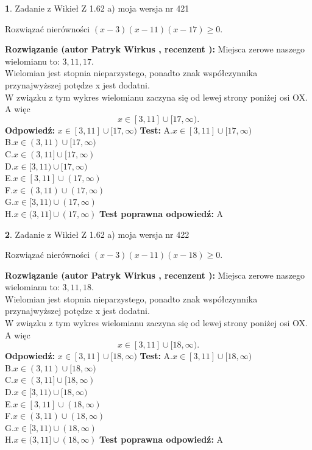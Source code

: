 \documentclass[12pt, a4paper]{article}
\theoremstyle{definition} %
\newtheorem{zad}{}
\newcommand{\zadStart}[1]{\begin{zad}#1\newline}
\newcommand{\zadStop}{\end{zad}}
\newcommand{\rozwStart}[2]{\noindent \textbf{Rozwiązanie (autor #1 , recenzent #2): }\newline}
\newcommand{\rozwStop}{\newline}
\newcommand{\odpStart}{\noindent \textbf{Odpowiedź:}\newline}
\newcommand{\odpStop}{\newline}
\newcommand{\testStart}{\noindent \textbf{Test:}\newline}
\newcommand{\testStop}{\newline}
\newcommand{\kluczStart}{\noindent \textbf{Test poprawna odpowiedź:}\newline}
\newcommand{\kluczStop}{\newline}
\begin{document}
\zadStart{Zadanie z Wikieł Z 1.62 a) moja wersja nr 421}

Rozwiązać nierówności $(x-3)(x-11)(x-17)\ge0$.
\zadStop
\rozwStart{Patryk Wirkus}{}
Miejsca zerowe naszego wielomianu to: $3, 11, 17$.\\
Wielomian jest stopnia nieparzystego, ponadto znak współczynnika przy\linebreak najwyższej potędze x jest dodatni.\\ W związku z tym wykres wielomianu zaczyna się od lewej strony poniżej osi OX. A więc $$x \in [3,11] \cup [17,\infty).$$
\rozwStop
\odpStart
$x \in [3,11] \cup [17,\infty)$
\odpStop
\testStart
A.$x \in [3,11] \cup [17,\infty)$\\
B.$x \in (3,11) \cup [17,\infty)$\\
C.$x \in (3,11] \cup [17,\infty)$\\
D.$x \in [3,11) \cup [17,\infty)$\\
E.$x \in [3,11] \cup (17,\infty)$\\
F.$x \in (3,11) \cup (17,\infty)$\\
G.$x \in [3,11) \cup (17,\infty)$\\
H.$x \in (3,11] \cup (17,\infty)$
\testStop
\kluczStart
A
\kluczStop



\zadStart{Zadanie z Wikieł Z 1.62 a) moja wersja nr 422}

Rozwiązać nierówności $(x-3)(x-11)(x-18)\ge0$.
\zadStop
\rozwStart{Patryk Wirkus}{}
Miejsca zerowe naszego wielomianu to: $3, 11, 18$.\\
Wielomian jest stopnia nieparzystego, ponadto znak współczynnika przy\linebreak najwyższej potędze x jest dodatni.\\ W związku z tym wykres wielomianu zaczyna się od lewej strony poniżej osi OX. A więc $$x \in [3,11] \cup [18,\infty).$$
\rozwStop
\odpStart
$x \in [3,11] \cup [18,\infty)$
\odpStop
\testStart
A.$x \in [3,11] \cup [18,\infty)$\\
B.$x \in (3,11) \cup [18,\infty)$\\
C.$x \in (3,11] \cup [18,\infty)$\\
D.$x \in [3,11) \cup [18,\infty)$\\
E.$x \in [3,11] \cup (18,\infty)$\\
F.$x \in (3,11) \cup (18,\infty)$\\
G.$x \in [3,11) \cup (18,\infty)$\\
H.$x \in (3,11] \cup (18,\infty)$
\testStop
\kluczStart
A
\kluczStop
\end{document}
